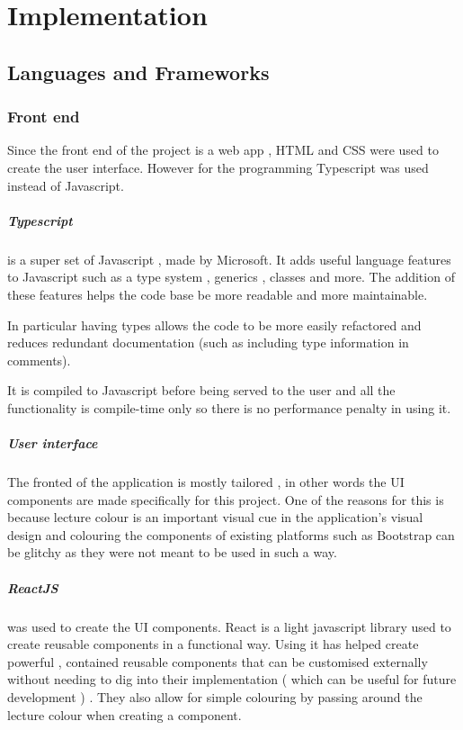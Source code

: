 \chapter{Implementation}

\section{Languages and Frameworks}
\subsection{Front end} 
Since the front end of the project is a web app , HTML and CSS were used to create the user interface. However for the programming Typescript was used instead of Javascript.

\paragraph{Typescript} is a super set of Javascript , made by Microsoft. It adds useful language features to Javascript such as a type system , generics , classes and more. The addition of these features helps the code base be more readable and more maintainable.

In particular having types allows the code to be more easily refactored and reduces redundant documentation (such as including type information in comments).

It is compiled to Javascript before being served to the user and all the functionality is compile-time only so there is no performance penalty in using it.

\paragraph{User interface}
The fronted of the application is mostly tailored , in other words the UI components are made specifically for this project. One of the reasons for this is because lecture colour is an important visual cue in the application's visual design and colouring the components of existing platforms such as Bootstrap can be glitchy as they were not meant to be used in such a way.

\paragraph{ReactJS} was used to create the UI components. React is a light javascript library used to create reusable components in a functional way. Using it has helped create powerful , contained reusable components that can be customised externally without needing to dig into their implementation ( which can be useful for future development ) . They also allow for simple colouring by passing around the lecture colour when creating a component.

